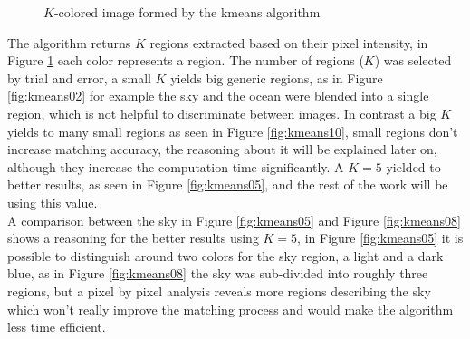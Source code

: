 \documentclass[12pt,a4paper]{article}
\begin{document}
\begin{figure}[!h]
{{		}
		\label{fig:kmeans08}
	}
	\quad
	\caption{$K$-colored image formed by the kmeans algorithm}
	\label{fig:kmeans}
\end{figure}

The algorithm returns $K$ regions extracted based on their pixel intensity, in Figure \ref{fig:kmeans} each color represents a region. The number of regions ($K$) was selected by trial and error, a small $K$ yields big generic regions, as in Figure \ref{fig:kmeans02} for example the sky and the ocean were blended into a single region, which is not helpful to discriminate between images. In contrast a big $K$ yields to many small regions as seen in Figure \ref{fig:kmeans10}, small regions don't increase matching accuracy, the reasoning about it will be explained later on, although they increase the computation time significantly. A $K = 5$ yielded to better results, as seen in Figure \ref{fig:kmeans05}, and the rest of the work will be using this value. \\

A comparison between the sky in Figure \ref{fig:kmeans05} and Figure \ref{fig:kmeans08} shows a reasoning for the better results using $K = 5$, in Figure \ref{fig:kmeans05} it is possible to distinguish around two colors for the sky region, a light and a dark blue, as in Figure \ref{fig:kmeans08} the sky was sub-divided into roughly three regions, but a pixel by pixel analysis reveals more regions describing the sky which won't really improve the matching process and would make the algorithm less time efficient. \\
\end{document}
